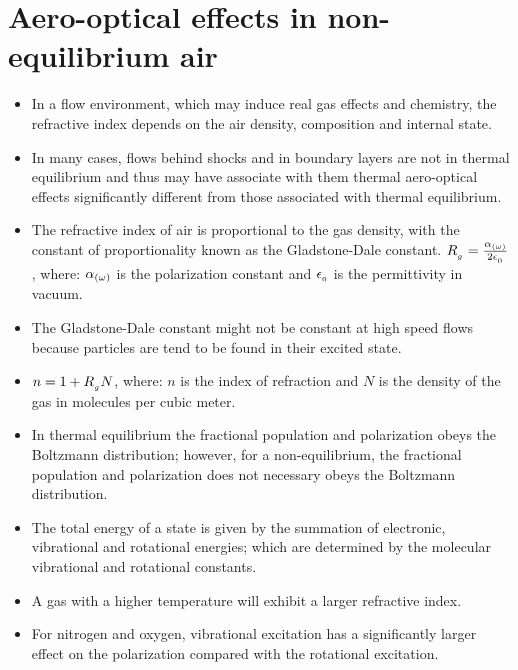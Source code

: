     \section{Aero-optical effects in non-equilibrium air \cite{tropina:plc:2018}}
        \begin{itemize}
            \item In a flow environment, which may induce real gas effects and chemistry, the refractive index depends on the air density, composition and internal state. 
            \item In many cases, flows behind shocks and in boundary layers are not in thermal equilibrium and thus may have associate with them thermal aero-optical effects significantly different from those associated with thermal equilibrium. 
            \item The refractive index of air is proportional to the gas density, with the constant of proportionality known as the Gladstone-Dale constant. $R_{_{g}} = \frac{\alpha_{\left(\omega\right)}}{2\epsilon_{_{0}}}$, where: $\alpha_{\left(\omega\right)}$ is the polarization constant and $\epsilon_{_{0}}$ is the permittivity in vacuum. 
            \item The Gladstone-Dale constant might not be constant at high speed flows because particles are tend to be found in their excited state. 
            \item $n = 1 + R_{_{g}}N$, where: $n$ is the index of refraction and $N$ is the density of the gas in molecules per cubic meter.  
            \item In thermal equilibrium the fractional population and polarization obeys the Boltzmann distribution; however, for a non-equilibrium, the fractional population and polarization does not necessary obeys the Boltzmann distribution.  
            \item The total energy of a state is given by the summation of electronic, vibrational and rotational energies; which are determined by the molecular vibrational and rotational constants.
            \item A gas with a higher temperature will exhibit a larger refractive index. 
            \item For nitrogen and oxygen, vibrational excitation has a significantly larger effect on the polarization compared with the rotational excitation. 
        \end{itemize}


